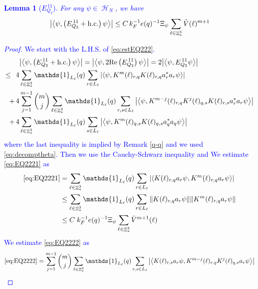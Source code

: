 \documentclass[sn-mathphys, Numbered ,a4paper]{sn-jnl}%
\DeclareMathOperator{\Z}{\mathbb{Z}}
\DeclareMathOperator{\HH}{\mathcal{H}}
\newcommand{\eva}[1]{\left\langle #1 \right\rangle}
\theoremstyle{plain}
\newtheorem{lemma}[theorem]{Lemma}
\theoremstyle{definition}
\theoremstyle{remark}
\theoremstyle{plain}
\theoremstyle{definition}
\theoremstyle{remark}
\begin{document}
\textcolor{blue}{\begin{lemma}[$E_{Q_2}^{\,11}$]\label{lem:EQ222}
		For any $\psi \in \HH_N$, we have
		\begin{equation}
			\abs{\eva{\psi,\left(E^{\,11}_{Q_2}+\mathrm{h.c.}\right) \psi }}
			\leq   C\, k_{F}^{-1} e(q)^{-1} \Xi_{\psi} \sum\limits_{\ell \in \Z^3_*} \hat{V}(\ell)^{m+1}  \label{eq:estEQ222}
		\end{equation}
	\end{lemma}
	\begin{proof}
		We start with the L.H.S. of \eqref{eq:estEQ222}.
		\begin{align}
			&\abs{\eva{\psi,\left(E^{\,11}_{Q_2}+\mathrm{h.c.}\right) \psi }} = \abs{\eva{\psi,2\mathrm{Re}\left(E^{\,11}_{Q_2}\right) \psi }} = 2\abs{\eva{\psi, E^{\,11}_{Q_2} \psi }}\nonumber\\
			\leq\,\;4& \sum\limits_{\ell \in \Z^3_*} \mathds{1}_{L_{\ell}}(q) \sum\limits_{r\in L_{\ell}} \abs{\eva{\psi, K^m(\ell)_{r,q} K(\ell)_{r,q} a^*_{r} a_{r} \psi }}\label{eq:EQ2221}\\
			+\,4& \sum\limits_{j=1}^{m-1} {{m}\choose j} \sum\limits_{\ell \in \Z^3_*}\mathds{1}_{L_{\ell}}(q) \sum\limits_{r,s\in L_{\ell}}  \abs{\eva{\psi,K^{m-j}(\ell)_{r,q} K^{j}(\ell)_{q,s} K(\ell)_{r,s} a^*_{r} a_{r}   \psi }}\label{eq:EQ2222}\\
			+\,4&\sum\limits_{\ell \in \Z^3_*} \mathds{1}_{L_{\ell}}(q) \sum\limits_{ s \in L_{\ell}} \abs{\eva{\psi, K^m(\ell)_{q,s} K(\ell)_{q,s} a^*_{q} a_{q} \psi }}\label{eq:EQ2223}
		\end{align}
		where the last inequality is implied by Remark \ref{q-q} and we used \eqref{eq:decomptheta}. Then we use the Cauchy-Schwarz inequality and We estimate \eqref{eq:EQ2221} as 
		\begin{align}
			\eqref{eq:EQ2221}
			&= \sum\limits_{\ell \in \Z^3_*} \mathds{1}_{L_{\ell}}(q) \sum\limits_{r\in L_{\ell}} \abs{\eva{ K(\ell)_{r,q} a_{r} \psi, K^m(\ell)_{r,q}  a_{r} \psi }}\nonumber\\
			&\leq \sum\limits_{\ell \in \Z^3_*} \mathds{1}_{L_{\ell}}(q) \sum\limits_{r\in L_{\ell}} \norm{ K(\ell)_{r,q} a_{r} \psi}\norm{ K^m(\ell)_{r,q}  a_{r} \psi }\nonumber\\
			&\leq C\; k_F^{-1}e(q)^{-1}\Xi_{\psi} \sum\limits_{\ell \in \Z^3_*}\hat{V}^{m+1}(\ell) \label{eq:estEQ2221}
		\end{align}
		We estimate \eqref{eq:EQ2222} as
		\begin{align}
			\eqref{eq:EQ2222}
			&=\sum\limits_{j=1}^{m-1} {{m}\choose j} \sum\limits_{\ell \in \Z^3_*}\mathds{1}_{L_{\ell}}(q) \sum\limits_{r,s\in L_{\ell}}  \abs{\eva{ K(\ell)_{r,s} a_{r}\psi, K^{m-j}(\ell)_{r,q} K^{j}(\ell)_{q,s} a_{r} \psi }}\nonumber\\

\end{align}
\end{proof}}
\end{document}
